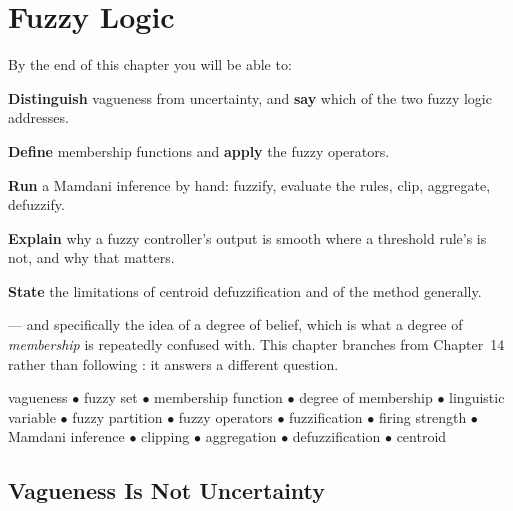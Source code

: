\chapter{Fuzzy Logic}\label{ch:fuzzy}

\begin{outcomes}
By the end of this chapter you will be able to:
\begin{tight}
  \item \textbf{Distinguish} vagueness from uncertainty, and \textbf{say} which of
        the two fuzzy logic addresses.
  \item \textbf{Define} membership functions and \textbf{apply} the fuzzy
        operators.
  \item \textbf{Run} a Mamdani inference by hand: fuzzify, evaluate the rules,
        clip, aggregate, defuzzify.
  \item \textbf{Explain} why a fuzzy controller's output is smooth where a
        threshold rule's is not, and why that matters.
  \item \textbf{State} the limitations of centroid defuzzification and of the
        method generally.
\end{tight}
\end{outcomes}

\begin{prereq}
 --- and specifically the idea of a degree of belief, which is
what a degree of \emph{membership} is repeatedly confused with. This chapter branches
from Chapter~14 rather than following : it answers a different
question.
\end{prereq}

\begin{keyterms}
vagueness $\bullet$ fuzzy set $\bullet$ membership function $\bullet$ degree of
membership $\bullet$ linguistic variable $\bullet$ fuzzy partition $\bullet$ fuzzy
operators $\bullet$ fuzzification $\bullet$ firing strength $\bullet$ Mamdani
inference $\bullet$ clipping $\bullet$ aggregation $\bullet$ defuzzification
$\bullet$ centroid
\end{keyterms}

\section{Vagueness Is Not Uncertainty}

